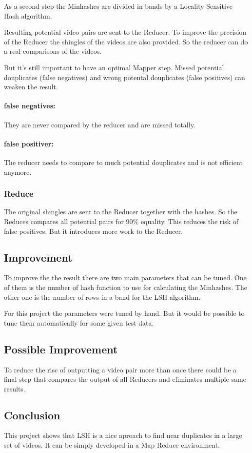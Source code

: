 \documentclass[a4paper, 11pt]{article}
\begin{document}
As a second step the Minhashes are divided in bands by a Locality Sensitive Hash
algorithm.

Resulting potential video pairs are sent to the Reducer. To improve the precision
of the Reducer the shingles of the videos are also provided. So the reducer can
do a real comparisons of the videos.

But it's still important to have an optimal Mapper step. Missed potential douplicates
(false negatives) and wrong potental douplicates (false positives) can weaken the result.

\paragraph{false negatives:} They are never compared by the reducer and are missed totally.

\paragraph{false positiver:} The reducer needs to compare to much potential douplicates and is not
efficient anymore.

\subsubsection{Reduce}

The original shingles are sent to the Reducer together with the hashes. So the Reduces
compares all potential pairs for 90\% equality. This reduces the risk of false positives.
But it introduces more work to the Reducer. 

\subsection{Improvement}

To improve the the result there are two main parameters that can be tuned.
One of them is the number of hash function to use for calculating the Minhashes.
The other one is the number of rows in a band for the LSH algorithm.

For this project the parameters were tuned by hand. But it would be possible to 
tune them automatically for some given test data.


\subsection{Possible Improvement}

To reduce the risc of outputting a video pair more than once there could be a final
step that compares the output of all Reducers and eliminates multiple same results.

\subsection{Conclusion}

This project shows that LSH is a nice aproach to find near duplicates in a large set
of videos. It can be simply developed in a Map Reduce environment.
\end{document}
